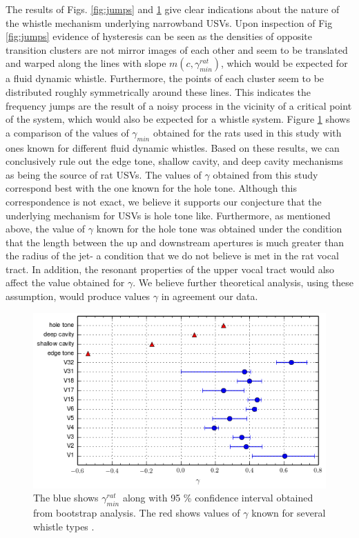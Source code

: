 \documentclass[twocolumn, prl]{revtex4}
\begin{document}
The results of Figs. \ref{fig:jumps} and \ref{fig:gamma_error} give clear indications about the nature of the whistle mechanism underlying narrowband USVs. Upon inspection of Fig \ref{fig:jumps} evidence of hysteresis can be seen as the densities of opposite transition clusters are not mirror images of each other and seem to be translated and warped along the lines with slope $m\left(c,\gamma_{min}^{rat}\right)$, which would be expected for a fluid dynamic whistle. Furthermore, the points of each cluster seem to be distributed roughly symmetrically around these lines. This indicates the frequency jumps are the result of a noisy process in the vicinity of a critical point of the system, which would also be expected for a whistle system. Figure \ref{fig:gamma_error} shows a comparison of the values of $\gamma_{min}$ obtained for the rats used in this study with ones known for different fluid dynamic whistles. Based on these results, we can conclusively rule out the edge tone, shallow cavity, and deep cavity mechanisms as being the source of rat USVs. The values of $\gamma$ obtained from this study correspond best with the one known for the hole tone. Although this correspondence is not exact, we believe it supports our conjecture that the underlying mechanism for USVs is hole tone like. Furthermore, as mentioned above, the value of $\gamma$ known for the hole tone was obtained under the condition that the length between the up and downstream apertures is much greater than the radius of the jet- a condition that we do not believe is met in the rat vocal tract. In addition, the resonant properties of the upper vocal tract would also affect the value obtained for $\gamma$. We believe further theoretical analysis, using these assumption, would produce values $\gamma$ in agreement our data.
\begin{figure}[!ht]
\centering
\includegraphics[width=\columnwidth]{gamma_error.png}
\caption{\label{fig:gamma_error} The blue shows $\gamma_{min}^{rat}$ along with 95 \% confidence interval obtained from bootstrap analysis. The red shows values of $\gamma$ known for several whistle types \cite{Howe2008}.}
\end{figure}


\end{document}
